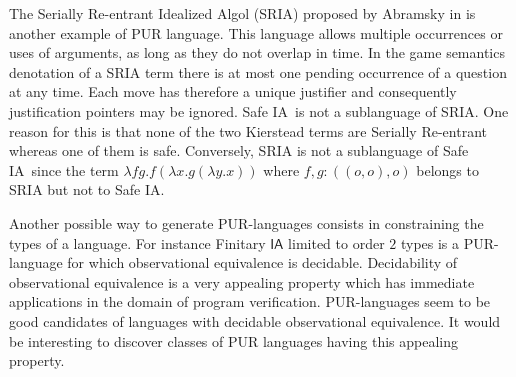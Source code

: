 \documentclass{llncs}
\newcommand\ialgol{\textsf{IA}}
\begin{document}
The Serially Re-entrant Idealized Algol (SRIA) proposed
by Abramsky  in \cite{abramsky:mchecking_ia}
is another example of PUR language. This language allows
multiple occurrences or uses of arguments, as long as they do not
overlap in time. In the game semantics denotation of a SRIA term
there is at most one pending occurrence of a question at any time.
Each move has therefore a unique justifier and consequently
justification pointers may be ignored. Safe \ialgol\ is not a
sublanguage of SRIA. One reason for this is that none of the two
Kierstead terms are Serially Re-entrant whereas one of them is safe.
Conversely, SRIA is not a sublanguage of Safe \ialgol\ since the term $\lambda f g. f (\lambda
x . g (\lambda y .x ))$ where $f,g:((o,o),o)$ belongs to SRIA but
not to Safe \ialgol.

Another possible way to generate PUR-languages consists in constraining
the types of a language. For instance Finitary $\ialgol$ limited to order $2$ types is a PUR-language for which
observational equivalence is decidable. Decidability of observational equivalence is a very
appealing property which has immediate applications in the domain of
program verification. PUR-languages seem to be good
candidates of languages with decidable observational equivalence.
It would be interesting to discover classes of PUR
languages having this appealing property.
\end{document}
